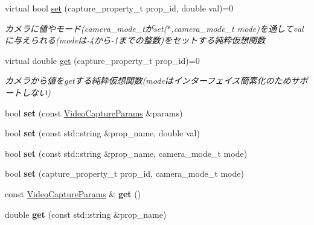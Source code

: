 \begin{DoxyCompactItemize}
\hypertarget{classskl_1_1___video_capture_interface_a02ca8e0e253ee5f88cc5d078123d4caf}{}\label{classskl_1_1___video_capture_interface_a02ca8e0e253ee5f88cc5d078123d4caf} 
virtual bool \hyperlink{classskl_1_1___video_capture_interface_a02ca8e0e253ee5f88cc5d078123d4caf}{set} (capture\+\_\+property\+\_\+t prop\+\_\+id, double val)=0
\begin{DoxyCompactList}\small\item\em カメラに値やモード(camera\+\_\+mode\+\_\+tがset($\ast$,camera\+\_\+mode\+\_\+t mode)を通してvalに与えられる(modeは-\/4から-\/1までの整数)をセットする純粋仮想関数 \end{DoxyCompactList}\item 
\hypertarget{classskl_1_1___video_capture_interface_a9cb748d4cc424556936febfaaa74d9d8}{}\label{classskl_1_1___video_capture_interface_a9cb748d4cc424556936febfaaa74d9d8} 
virtual double \hyperlink{classskl_1_1___video_capture_interface_a9cb748d4cc424556936febfaaa74d9d8}{get} (capture\+\_\+property\+\_\+t prop\+\_\+id)=0
\begin{DoxyCompactList}\small\item\em カメラから値をgetする純粋仮想関数(modeはインターフェイス簡素化のためサポートしない) \end{DoxyCompactList}\item 
\hypertarget{classskl_1_1___video_capture_interface_a0a5b4a468dd49b004b9ccf087190e145}{}\label{classskl_1_1___video_capture_interface_a0a5b4a468dd49b004b9ccf087190e145} 
bool {\bfseries set} (const \hyperlink{classskl_1_1_video_capture_params}{Video\+Capture\+Params} \&params)
\item 
\hypertarget{classskl_1_1___video_capture_interface_a012ea0273c77069c70c8c2d8b2d1648d}{}\label{classskl_1_1___video_capture_interface_a012ea0273c77069c70c8c2d8b2d1648d} 
bool {\bfseries set} (const std\+::string \&prop\+\_\+name, double val)
\item 
\hypertarget{classskl_1_1___video_capture_interface_ad7e9069d5579b736e7b1088595ab12db}{}\label{classskl_1_1___video_capture_interface_ad7e9069d5579b736e7b1088595ab12db} 
bool {\bfseries set} (const std\+::string \&prop\+\_\+name, camera\+\_\+mode\+\_\+t mode)
\item 
\hypertarget{classskl_1_1___video_capture_interface_a5ed9bbd7ac6450a5d343e1c24c7f0ed7}{}\label{classskl_1_1___video_capture_interface_a5ed9bbd7ac6450a5d343e1c24c7f0ed7} 
bool {\bfseries set} (capture\+\_\+property\+\_\+t prop\+\_\+id, camera\+\_\+mode\+\_\+t mode)
\item 
\hypertarget{classskl_1_1___video_capture_interface_ae8521689d8536434e121ffcaf42a2653}{}\label{classskl_1_1___video_capture_interface_ae8521689d8536434e121ffcaf42a2653} 
const \hyperlink{classskl_1_1_video_capture_params}{Video\+Capture\+Params} \& {\bfseries get} ()
\item 
\hypertarget{classskl_1_1___video_capture_interface_a3ab336503077b3567c56fbe3f0d2dbaa}{}\label{classskl_1_1___video_capture_interface_a3ab336503077b3567c56fbe3f0d2dbaa} 
double {\bfseries get} (const std\+::string \&prop\+\_\+name)
\end{DoxyCompactItemize}
